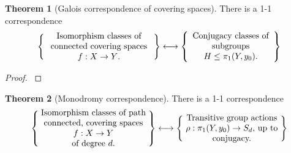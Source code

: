 \documentclass[12pt,a4paper,openright,twoside]{report}
\theoremstyle{definition} %
\newtheorem{theorem}{Theorem}[chapter]
\begin{document}
\begin{theorem}[Galois correspondence of covering spaces]\label{thm:GaloisCorrespondence}
    There is a 1-1 correspondence
    \[     
     \left\{
        \parbox{4.5cm}{\centering Isomorphism classes of connected covering spaces \(f:X \to Y\).}
     \right\}
     \longleftrightarrow
     \left\{
        \parbox{3.5cm}{\centering Conjugacy classes of subgroups \(H \leq \pi_1(Y,y_0)\).}
     \right\}
    \] 
\end{theorem}

\begin{proof}
    \cite[Ch. 1, Thm. 1.38, p. 67]{Hatcher02}
\end{proof}

\begin{theorem}[Monodromy correspondence]
    There is a 1-1 correspondence
    \[     
     \left\{
        \parbox{4.5cm}{\centering Isomorphism classes of path connected, covering spaces \(f:X \to Y\) \\ of degree \(d\).}
     \right\}
     \longleftrightarrow
     \left\{
        \parbox{4cm}{\centering Transitive group actions \(\rho : \pi_1(Y,y_0) \to S_d\), up to conjugacy.}
     \right\}
    \] 
\end{theorem}
\end{document}
